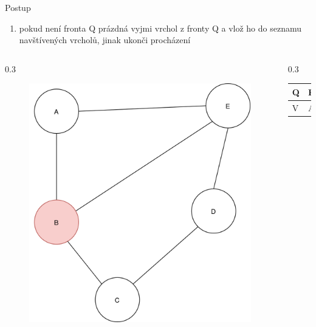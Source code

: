 \documentclass[hyperref={unicode}]{beamer}
\begin{document}
\begin{frame}
\begin{block}{Postup}
\begin{enumerate}
  [default]
    \item pokud není fronta Q prázdná vyjmi vrchol z fronty Q a vlož ho do seznamu navštívených vrcholů, jinak ukonči procházení
\end{enumerate}
\end{block}
  \begin{columns}[T]
    \begin{column}{0.3\linewidth}
        \begin{figure}
        \includegraphics[width=\linewidth]{state3.png}
        \end{figure}
    \end{column}
    \begin{column}{0.3\linewidth}
    \begin{table}[]
        \begin{tabular}{|l||l|l|l|}
        \hline
        Q & E &  &  \\ \hline
        V & A & B &  \\ \hline
        \end{tabular}
\end{table}
    \end{column}
  \end{columns}
\end{frame}
\end{document}
